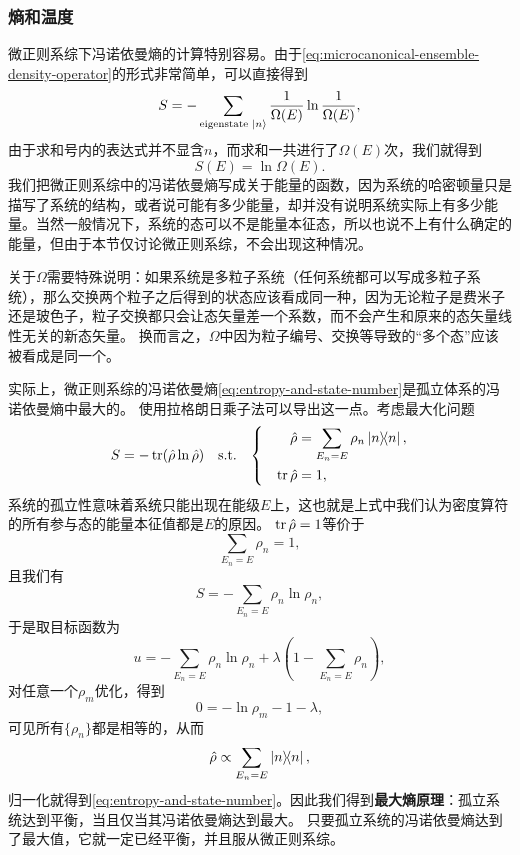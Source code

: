 \documentclass[hyperref, UTF8, a4paper]{ctexart}
\newenvironment{bigcase}{\left\{\quad\begin{aligned}}{\end{aligned}\right.}
\begin{document}
\subsubsection{熵和温度}\label{sec:entropy-and-temperature}

微正则系综下冯诺依曼熵的计算特别容易。由于\eqref{eq:microcanonical-ensemble-density-operator}的形式非常简单，可以直接得到
\[
    S = - \sum_\text{eigenstate $\ket{n}$} \frac{1}{\Omega(E)} \ln \frac{1}{\Omega(E)},
\]
由于求和号内的表达式并不显含$n$，而求和一共进行了$\Omega(E)$次，我们就得到
\begin{equation}
    S(E) = \ln \Omega(E).
    \label{eq:entropy-and-state-number}
\end{equation}
我们把微正则系综中的冯诺依曼熵写成关于能量的函数，因为系统的哈密顿量只是描写了系统的结构，或者说可能有多少能量，却并没有说明系统实际上有多少能量。当然一般情况下，系统的态可以不是能量本征态，所以也说不上有什么确定的能量，但由于本节仅讨论微正则系综，不会出现这种情况。

关于$\Omega$需要特殊说明：如果系统是多粒子系统（任何系统都可以写成多粒子系统），那么交换两个粒子之后得到的状态应该看成同一种，因为无论粒子是费米子还是玻色子，粒子交换都只会让态矢量差一个系数，而不会产生和原来的态矢量线性无关的新态矢量。
换而言之，$\Omega$中因为粒子编号、交换等导致的“多个态”应该被看成是同一个。

实际上，微正则系综的冯诺依曼熵\eqref{eq:entropy-and-state-number}是孤立体系的冯诺依曼熵中最大的。
使用拉格朗日乘子法可以导出这一点。考虑最大化问题
\[
    S = - \trace (\hat{\rho} \ln \hat{\rho}) \quad \text{s.t.} \quad \begin{bigcase}
        \hat{\rho} &= \sum_{E_n=E} \rho_n \dyad{n}, \\
        \trace \hat{\rho} &= 1,
    \end{bigcase}
\]
系统的孤立性意味着系统只能出现在能级$E$上，这也就是上式中我们认为密度算符的所有参与态的能量本征值都是$E$的原因。
$\trace \hat{\rho} = 1$等价于
\[
    \sum_{E_n=E} \rho_n = 1,
\]
且我们有
\[
    S = - \sum_{E_n=E} \rho_n \ln \rho_n,
\]
于是取目标函数为
\[
    u = - \sum_{E_n=E} \rho_n \ln \rho_n + \lambda \left(1 - \sum_{E_n=E} \rho_n\right),
\]
对任意一个$\rho_m$优化，得到
\[
    0 = - \ln \rho_m - 1 - \lambda,
\]
可见所有$\{\rho_n\}$都是相等的，从而
\[
    \hat{\rho} \propto \sum_{E_n=E} \dyad{n},
\]
归一化就得到\eqref{eq:entropy-and-state-number}。因此我们得到\textbf{最大熵原理}：孤立系统达到平衡，当且仅当其冯诺依曼熵达到最大。
只要孤立系统的冯诺依曼熵达到了最大值，它就一定已经平衡，并且服从微正则系综。
\end{document}
